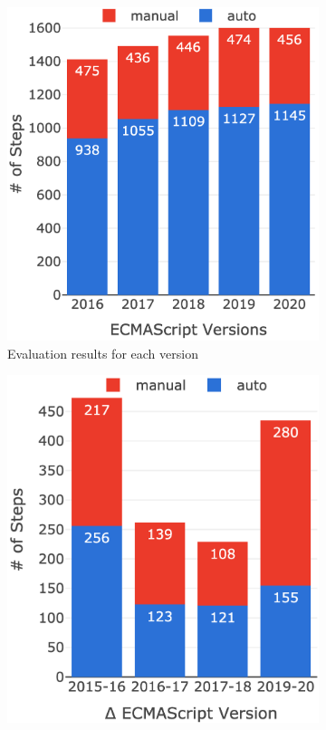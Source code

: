 \begin{figure}[t]
  \centering
  \begin{subfigure}{0.23\textwidth}
    \includegraphics[width=\textwidth]{img/all-version-sem.png}
    \caption{Evaluation results for each version}
    \label{fig:semantics-all-version}
  \end{subfigure}
  \hfill
  \begin{subfigure}{0.20\textwidth}
    \includegraphics[width=\textwidth]{img/all-version-sem-delta.png}

\end{subfigure}
\end{figure}
